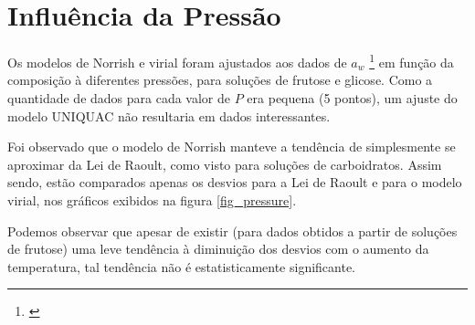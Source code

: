 \documentclass[
	12pt,				%
	openright,
	twoside,
	a4paper,			%
	english,			%
	french,				%
	spanish,			%
	brazil				%
	]{abntex2}
\begin{document}
\section{Influência da Pressão}

Os modelos de Norrish e virial foram ajustados aos dados de $a_w$
\footnote{\cite{maximo2010}} em função da composição à diferentes pressões,
para soluções de frutose e glicose. Como a quantidade de dados para cada
valor de $P$ era pequena (5 pontos), um ajuste do modelo UNIQUAC não resultaria
em dados interessantes.

Foi observado que o modelo de Norrish manteve a tendência de simplesmente se
aproximar da Lei de Raoult, como visto para soluções de carboidratos. Assim sendo,
estão comparados apenas os desvios para a Lei de Raoult e para o modelo virial,
nos gráficos exibidos na figura \ref{fig_pressure}.

Podemos observar que apesar de existir (para dados obtidos a partir de soluções
de frutose) uma leve tendência à diminuição dos desvios com o aumento da temperatura,
tal tendência não é estatisticamente significante.
\end{document}
